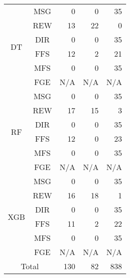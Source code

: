 \begin{table}[htbp]
\begin{center}
\begin{tabular}{|c|c|r|r|r|}
                \multirow{6}{*}{DT} & MSG & 0 & 0 & 35 \\
                \cline{2-5}
                    & REW & 13 & 22 & 0 \\
                \cline{2-5}
                    & DIR & 0 & 0 & 35 \\
                \cline{2-5}
                    & FFS &  12 & 2 & 21 \\
                \cline{2-5}
                    & MFS & 0 & 0 & 35 \\
                \cline{2-5}
                    & FGE & N/A & N/A & N/A \\
                \cline{1-5}

                \multirow{6}{*}{RF} & MSG & 0 & 0 & 35 \\
                \cline{2-5}
                    & REW & 17 & 15 & 3 \\
                \cline{2-5}
                    & DIR & 0 & 0 & 35 \\
                \cline{2-5}
                    & FFS &  12 & 0 & 23 \\
                \cline{2-5}
                    & MFS & 0 & 0 & 35 \\
                \cline{2-5}
                    & FGE & N/A & N/A & N/A \\
                \cline{1-5}
                
                \multirow{6}{*}{XGB} & MSG & 0 & 0 & 35 \\
                \cline{2-5}
                    & REW & 16 & 18 & 1 \\
                \cline{2-5}
                    & DIR & 0 & 0 & 35 \\
                \cline{2-5}
                    & FFS &  11 & 2 & 22 \\
                \cline{2-5}
                    & MFS & 0 & 0 & 35 \\
                \cline{2-5}
                    & FGE & N/A & N/A & N/A \\
                \cline{1-5}
                
                \multicolumn{2}{|c|}{Total} & 130 & 82 & 838 \\
                \hline
            \end{tabular}
    \end{center}
\end{table}